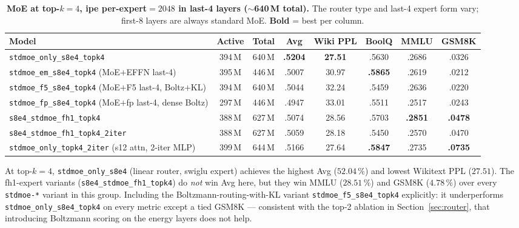 \documentclass[oneside]{article}
\begin{document}
\begin{table}[t]
\centering
\caption{\textbf{MoE at top-$k=4$, ipe per-expert$=2048$ in last-4 layers
($\sim$640\,M total).} The router type and last-4 expert form vary;
first-8 layers are always standard MoE. \textbf{Bold} = best per
column.}
\label{tab:topk4}
\begin{adjustbox}{max width=\textwidth}
\begin{tabular}{l|cc|c|c|c|c|c}
\toprule
\textbf{Model} & \textbf{Active} & \textbf{Total} & \textbf{Avg} & \textbf{Wiki PPL} & \textbf{BoolQ} & \textbf{MMLU} & \textbf{GSM8K} \\
\midrule
\texttt{stdmoe\_only\_s8e4\_topk4}            & 394\,M & 640\,M & \textbf{.5204} & \textbf{27.51} & .5630 & .2686 & .0326 \\
\texttt{stdmoe\_em\_s8e4\_topk4} (MoE$+$EFFN last-4) & 395\,M & 446\,M & .5007 & 30.97 & \textbf{.5865} & .2619 & .0212 \\
\texttt{stdmoe\_f5\_s8e4\_topk4} (MoE$+$F5 last-4, Boltz$+$KL) & 394\,M & 640\,M & .5044 & 32.24 & .5459 & .2636 & .0220 \\
\texttt{stdmoe\_fp\_s8e4\_topk4} (MoE$+$fp last-4, dense Boltz) & 297\,M & 446\,M & .4947 & 33.01 & .5511 & .2517 & .0243 \\
\midrule
\texttt{s8e4\_stdmoe\_fh1\_topk4}             & 388\,M & 627\,M & .5074 & 28.56 & .5703 & \textbf{.2851} & \textbf{.0478} \\
\texttt{s8e4\_stdmoe\_fh1\_topk4\_2iter}      & 388\,M & 627\,M & .5059 & 28.18 & .5450 & .2570 & .0470 \\
\midrule
\texttt{stdmoe\_only\_topk4\_2iter} (s12 attn, 2-iter MLP)     & 399\,M & 644\,M & .5166 & 27.64 & \textbf{.5847} & .2735 & \textbf{.0735} \\
\bottomrule
\end{tabular}
\end{adjustbox}
\end{table}

At top-$k{=}4$, \texttt{stdmoe\_only\_s8e4} (linear router, swiglu
expert) achieves the highest Avg ($52.04\,\%$) and lowest Wikitext PPL
($27.51$). The fh1-expert variants (\texttt{s8e4\_stdmoe\_fh1\_topk4})
do \emph{not} win Avg here, but they win MMLU ($28.51\,\%$) and
GSM8K ($4.78\,\%$) over every \texttt{stdmoe-*} variant in this group.
Including the Boltzmann-routing-with-KL variant
\texttt{stdmoe\_f5\_s8e4\_topk4} explicitly: it underperforms
\texttt{stdmoe\_only\_s8e4\_topk4} on every metric except a tied
GSM8K --- consistent with the top-2 ablation in
Section~\ref{sec:router}, that introducing Boltzmann scoring on the
energy layers does not help.
\end{document}
